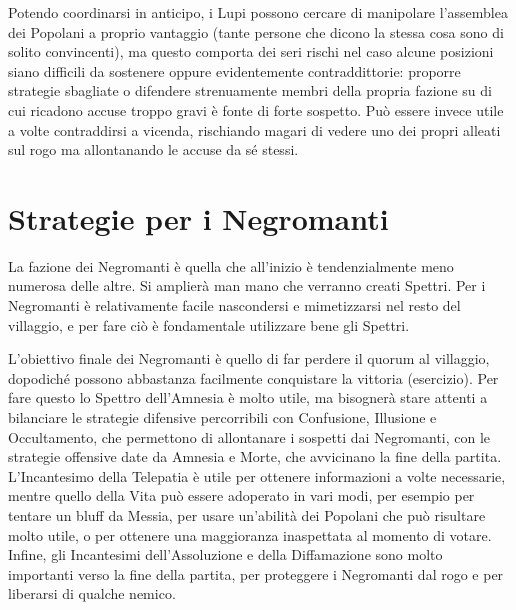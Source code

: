 \documentclass[a4paper,10pt]{article}
\begin{document}
Potendo coordinarsi in anticipo, i Lupi possono cercare di manipolare l'assemblea dei Popolani a proprio vantaggio (tante persone che dicono la stessa cosa sono di solito convincenti), ma questo comporta dei seri rischi nel caso alcune posizioni siano difficili da sostenere oppure evidentemente contraddittorie: proporre strategie sbagliate o difendere strenuamente membri della propria fazione su di cui ricadono accuse troppo gravi è fonte di forte sospetto. Può essere invece utile a volte contraddirsi a vicenda, rischiando magari di vedere uno dei propri alleati sul rogo ma allontanando le accuse da sé stessi.

\section{Strategie per i Negromanti}

La fazione dei Negromanti è quella che all'inizio è tendenzialmente meno numerosa delle altre. Si amplierà man mano che verranno creati Spettri. Per i Negromanti è relativamente facile nascondersi e mimetizzarsi nel resto del villaggio, e per fare ciò è fondamentale utilizzare bene gli Spettri.

L'obiettivo finale dei Negromanti è quello di far perdere il quorum al villaggio, dopodiché possono abbastanza facilmente conquistare la vittoria (esercizio). Per fare questo lo Spettro dell'Amnesia è molto utile, ma bisognerà stare attenti a bilanciare le strategie difensive percorribili con Confusione, Illusione e Occultamento, che permettono di allontanare i sospetti dai Negromanti, con le strategie offensive date da Amnesia e Morte, che avvicinano la fine della partita. L'Incantesimo della Telepatia è utile per ottenere informazioni a volte necessarie, mentre quello della Vita può essere adoperato in vari modi, per esempio per tentare un bluff da Messia, per usare un'abilità dei Popolani che può risultare molto utile, o per ottenere una maggioranza inaspettata al momento di votare. Infine, gli Incantesimi dell'Assoluzione e della Diffamazione sono molto importanti verso la fine della partita, per proteggere i Negromanti dal rogo e per liberarsi di qualche nemico.
\end{document}
